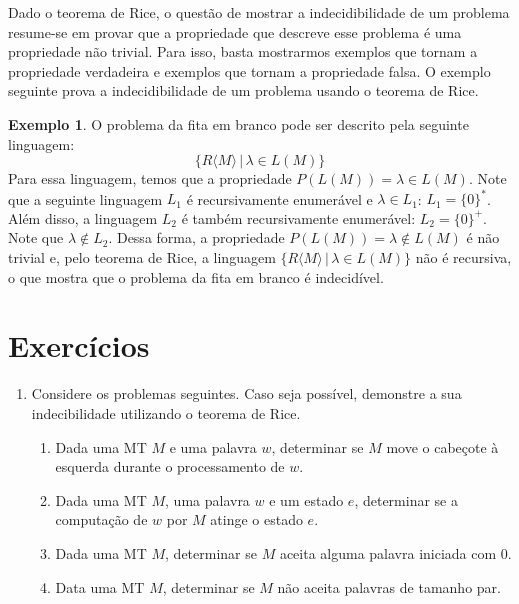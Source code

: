 \documentclass[a4paper]{article}
\theoremstyle{definition}
\newtheorem{Example}{Exemplo}
\begin{document}
      Dado o teorema de Rice, o questão de mostrar a indecidibilidade de um
      problema resume-se em provar que a propriedade que descreve esse problema
      é uma propriedade não trivial. Para isso, basta mostrarmos exemplos que
      tornam a propriedade verdadeira e exemplos que tornam a propriedade falsa.
      O exemplo seguinte prova a indecidibilidade de um problema usando o
      teorema de Rice.

      \begin{Example}
        O problema da fita em branco pode ser descrito pela seguinte linguagem:
        \[
          \{R\langle M \rangle\,|\, \lambda \in L(M)\}
        \]
        Para essa linguagem, temos que a propriedade $P(L(M)) = \lambda \in
        L(M)$. Note que a seguinte linguagem $L_1$ é recursivamente enumerável
        e $\lambda \in L_1$: $L_1 = \{0\}^*$. Além disso, a linguagem $L_2$ é
        também recursivamente enumerável: $L_2 = \{0\}^+$. Note que $\lambda
        \not\in L_2$. Dessa forma, a propriedade $P(L(M)) = \lambda \not\in
        L(M)$ é não trivial e, pelo teorema de Rice, a linguagem
        $\{R\langle M \rangle\,|\, \lambda \in L(M)\}$ não é recursiva, o que
        mostra que o problema da fita em branco é indecidível.
      \end{Example}
  \section{Exercícios}

  \begin{enumerate}
     \item Considere os problemas seguintes. Caso seja possível, demonstre a sua
       indecibilidade utilizando o teorema de Rice.
       \begin{enumerate}
          \item Dada uma MT $M$ e uma palavra $w$, determinar se $M$ move
            o cabeçote à esquerda durante o processamento de $w$.
          \item Dada uma MT $M$, uma palavra $w$ e um estado $e$, determinar
            se a computação de $w$ por $M$ atinge o estado $e$.
          \item Dada uma MT $M$, determinar se $M$ aceita alguma palavra
            iniciada com $0$.
          \item Data uma MT $M$, determinar se $M$ não aceita palavras de
            tamanho par.
       \end{enumerate}
  \end{enumerate}
\end{document}

